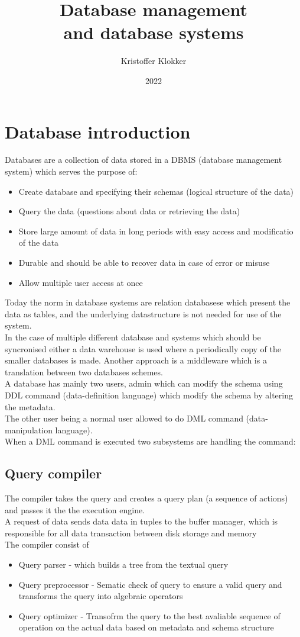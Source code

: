 \documentclass[12pt, a4paper]{article}
\title{Database management \\and database systems}
\date{2022}
\author{Kristoffer Klokker}
\begin{document}
	\maketitle
	\clearpage
	\tableofcontents
	\clearpage
	\section{Database introduction}
		Databases are a collection of data stored in a DBMS (database management system) which serves the purpose of:
			\begin{itemize}
				\item Create database and specifying their schemas (logical structure of the data)
				\item Query the data (questions about data or retrieving the data)
				\item Store large amount of data in long periods with easy access and modificatio of the data
				\item Durable and should be able to recover data in case of error or misuse
				\item Allow multiple user access at once
			\end{itemize}
			Today the norm in database systems are relation databasese which present the data as tables, and the underlying datastructure is not needed for use of the system.\\
			In the case of multiple different database and systems which should be syncronised either a data warehouse is used where a periodically copy of the smaller databases is made. Another approach is a middleware which is a translation between two databases schemes.\\
			A database has mainly two users, admin which can modify the schema using DDL command (data-definition language) which modify the schema by altering the metadata.\\
			The other user being a normal user allowed to do DML command (data-manipulation language). \\
			When a DML command is executed two subsystems are handling the command:
				\subsection{Query compiler}
					The compiler takes the query and creates a query plan (a sequence of actions) and passes it the the execution engine.\\
					A request of data sends data data in tuples to the buffer manager, which is responsible for all data transaction between disk storage and memory\\
					The compiler consist of
					\begin{itemize}
						\item Query parser - which builds a tree from the textual query
						\item Query preprocessor - Sematic check of query to ensure a valid query and transforms the query into algebraic operators
						\item Query optimizer - Transofrm the query to the best avaliable sequence of operation on the actual data based on metadata and schema structure
					\end{itemize}
\end{document}
